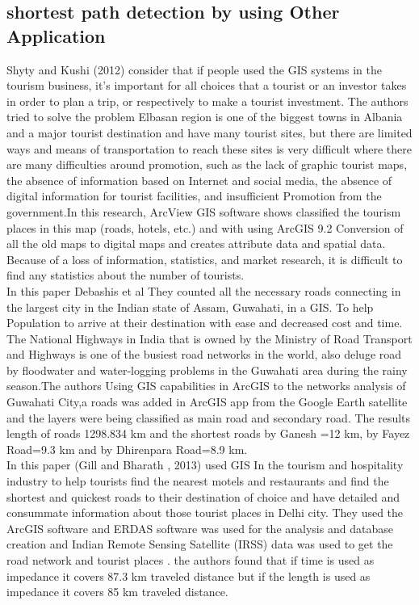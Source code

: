 \documentclass{article}
\begin{document}
\subsection{shortest path detection by using Other Application }
Shyty and Kushi (2012)\cite{shyti2012impact} consider that if people used the GIS systems in the tourism business, it's important for all choices that a tourist or an investor takes in order to plan a trip, or respectively to make a tourist investment. The authors tried to solve the problem Elbasan region is one of the biggest towns in Albania and a major tourist destination and have many tourist sites, but there are limited ways and means of transportation to reach these sites is very difficult where there are many difficulties around promotion, such as the lack of graphic tourist maps, the absence of information based on Internet and social media, the absence of digital information for tourist facilities, and insufficient Promotion from the government.In this research, ArcView GIS software shows classified the tourism places in this map (roads, hotels, etc.) and with using ArcGIS 9.2  Conversion of all the old maps to digital maps and creates attribute data and spatial data. Because of a loss of information, statistics, and market research, it is difficult to find any statistics about the number of tourists.
\\

 In this paper Debashis  et al \cite{das2019road} They counted all the necessary roads connecting in the largest city in the Indian state of Assam, Guwahati, in a GIS. To help Population to arrive at their destination with ease and decreased cost and time. The National Highways in India that is owned by the Ministry of Road Transport and Highways is one of the busiest road networks in the world, also deluge road by floodwater and water-logging problems in the Guwahati area during the rainy season.The authors Using GIS capabilities in ArcGIS to the networks analysis of Guwahati City,a roads was added in ArcGIS app from the Google Earth satellite and the layers were being classified as main road and secondary road. The results length of roads  1298.834 km and the shortest roads by Ganesh =12 km, by Fayez  Road=9.3 km and  by Dhirenpara Road=8.9 km.
 \\

In this paper  (Gill and Bharath , 2013)\cite{gill2013identification} used GIS In the tourism and hospitality industry to help tourists find the nearest motels and restaurants and find the shortest and quickest roads to their destination of choice and have detailed and consummate information about those tourist places in Delhi city.
 They used the ArcGIS software and ERDAS software was used for the analysis and database creation and Indian Remote Sensing Satellite (IRSS) data was used to get the road network and tourist places .
 the authors found that if time is used as impedance it covers 87.3 km traveled distance but if the length is used as impedance it covers 85 km traveled distance. 
 \clearpage

 
\end{document}
